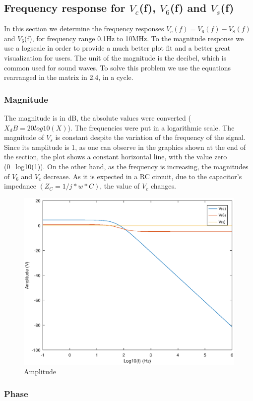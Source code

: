 \subsection{Frequency response for $V_c$(f), $V_6$(f) and $V_s$(f)}

In this section we determine the frequency responses $V_c(f) = V_6(f) - V_8(f)$ and $V_{6}$(f), for frequency range 0.1Hz to 10MHz. To the magnitude response we use a logscale in order to provide a much better plot fit and a better great visualization for users. The unit of the magnitude is the decibel, which is common used for sound waves. To solve this problem we use the equations rearranged in the matrix in 2.4, in a cycle.


\subsubsection{Magnitude}
The magnitude is in dB, the absolute values were converted ($X_dB=20log10(X)$). The frequencies were put in a logarithmic scale.
The magnitude of $V_s$ is constant despite the variation of the frequency of the signal. Since its amplitude is 1, as one can observe in the graphics shown at the end of the section, the plot shows a constant
horizontal line, with the value zero (0=log10(1)).
On the other hand, as the frequency is increasing, the magnitudes of $V_6$ and $V_c$ decrease. As it is expected in a  RC circuit, due to the capacitor's impedance $(Z_C = 1/j*w*C)$, the value of $V_c$ changes.

\begin{figure}[!h]\centering
\includegraphics[width=0.7\linewidth]{amplitude.eps}
\caption{Amplitude}
\label{fig:snat}
\end{figure}

\subsubsection{Phase}

